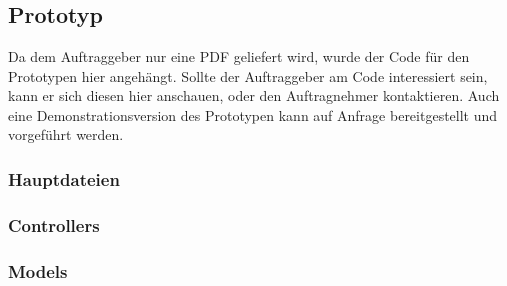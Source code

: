 \appendix


\chapter{\appendixname}\label{ch:appendixname}


\section{Prototyp}\label{sec:prototyp}
Da dem Auftraggeber nur eine \ac{PDF} geliefert wird, wurde der Code für den Prototypen hier angehängt.
Sollte der Auftraggeber am Code interessiert sein, kann er sich diesen hier anschauen, oder den Auftragnehmer kontaktieren.
Auch eine Demonstrationsversion des Prototypen kann auf Anfrage bereitgestellt und vorgeführt werden.

\subsection{Hauptdateien}\label{subsec:hauptdateien}

\pagebreak

\pagebreak

\subsection{Controllers}\label{subsec:controllers}

\pagebreak

\pagebreak

\pagebreak

\subsection{Models}\label{subsec:models}

\pagebreak

\pagebreak

\pagebreak

\pagebreak

\pagebreak


